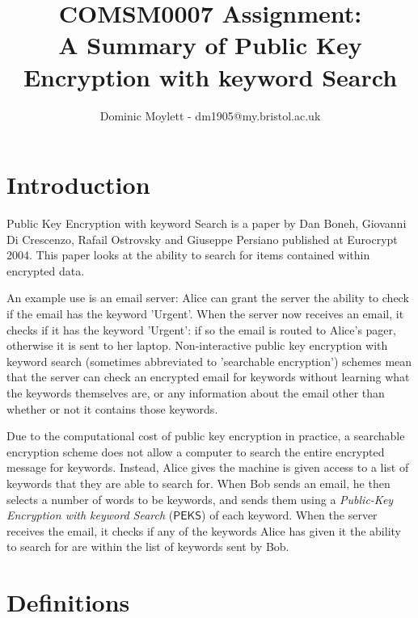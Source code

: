 \documentclass[a4paper,11pt]{article}
\title{COMSM0007 Assignment:\\A Summary of Public Key Encryption with keyword Search}
\author{Dominic Moylett - dm1905@my.bristol.ac.uk}
\begin{document}
    \maketitle

    \section{Introduction}

    Public Key Encryption with keyword Search\cite{cryptoeprint:2003:195} is a paper by Dan Boneh, Giovanni Di Crescenzo, Rafail Ostrovsky and Giuseppe Persiano published at Eurocrypt 2004. This paper looks at the ability to search for items contained within encrypted data.

    An example use is an email server: Alice can grant the server the ability to check if the email has the keyword 'Urgent'. When the server now receives an email, it checks if it has the keyword 'Urgent': if so the email is routed to Alice's pager, otherwise it is sent to her laptop. Non-interactive public key encryption with keyword search (sometimes abbreviated to 'searchable encryption') schemes mean that the server can check an encrypted email for keywords without learning what the keywords themselves are, or any information about the email other than whether or not it contains those keywords.

    Due to the computational cost of public key encryption in practice, a searchable encryption scheme does not allow a computer to search the entire encrypted message for keywords. Instead, Alice gives the machine is given access to a list of keywords that they are able to search for. When Bob sends an email, he then selects a number of words to be keywords, and sends them using a \textit{Public-Key Encryption with keyword Search} ($\mathsf{PEKS}$) of each keyword. When the server receives the email, it checks if any of the keywords Alice has given it the ability to search for are within the list of keywords sent by Bob.

    \section{Definitions}
\end{document}

